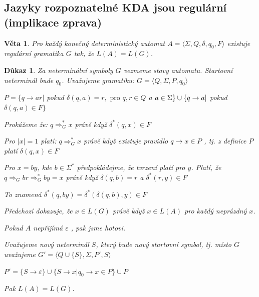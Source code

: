 \documentclass[10pt, a4paper, titlepage]{article}
\theoremstyle{note}
\newtheorem{dukaz}{Důkaz}
\newtheorem{veta}{Věta}
\begin{document}
\subsection{Jazyky rozpoznatelné KDA jsou regulární (implikace zprava)}

\begin{veta} 
Pro každý konečný deterministický automat $A = \langle \Sigma,Q,\delta,q_0,F \rangle$ existuje regulární gramatika $G$ tak, že $L(A)=L(G)$.
\end{veta}

\begin{dukaz}
Za neterminální symboly $G$ vezmeme stavy automatu. Startovní neterminál bude $q_0$. Uvažujeme gramatiku:
$G = \langle Q,\Sigma,P,q_0 \rangle$

$P = \lbrace q \rightarrow ar |$ pokud $\delta (q,a)=r, \text{ pro } q,r \in Q$ a $a \in \Sigma \rbrace \\ \cup \lbrace q \rightarrow a |$ pokud $\delta (q,a) \in F \rbrace$ 

Prokážeme že: $ q \Rightarrow_G^* x $ právě když $ \delta^* (q,x) \in F$

Pro $|x|=1$ platí: $ q \Rightarrow_G^* x $ právě když existuje pravidlo $q \rightarrow x \in P$ , tj. z definice $P$ platí $\delta (q,x) \in F$

Pro $x=by$, kde $b \in \Sigma^*$ předpokládejme, že tvrzení platí pro $y$. Platí, že $q \Rightarrow_G br \Rightarrow_G^* by = x$ právě když $\delta (q,b)=r$ a $\delta^* (r,y) \in F$

To znamená $\delta^* (q,by) = \delta^* ( \delta (q,b),y) \in F$

Předchozí dokazuje, že $x \in L(G)$ právě když $x \in L(A)$ pro každý neprázdný $x$.

Pokud $A$ nepřijímá $\varepsilon$ , pak jsme hotovi.

Uvažujeme nový neterminál $S$, který bude nový startovní symbol, tj. místo $G$ uvažujeme $G'= \langle Q \cup \lbrace S \rbrace,\Sigma,P',S \rangle$

$P'= \lbrace S \rightarrow \varepsilon \rbrace \cup \lbrace S \rightarrow x | q_0 \rightarrow x \in P \rbrace \cup P$

Pak $L(A)=L(G)$.
\end{dukaz}
\end{document}
